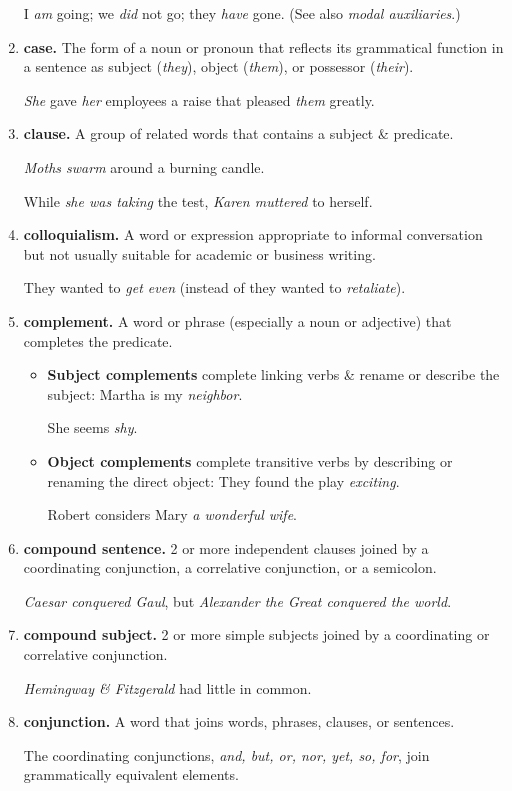 \documentclass{article}
\begin{document}
\begin{enumerate}
	I {\it am} going; we {\it did} not go; they {\it have} gone. (See also {\it modal auxiliaries}.)
	\item {\bf case.} The form of a noun or pronoun that reflects its grammatical function in a sentence as subject ({\it they}), object ({\it them}), or possessor ({\it their}).
	
	{\it She} gave {\it her} employees a raise that pleased {\it them} greatly.
	\item {\bf clause.} A group of related words that contains a subject \& predicate.
	
	{\it Moths swarm} around a burning candle.
	
	While {\it she was taking} the test, {\it Karen muttered} to herself.
	\item {\bf colloquialism.} A word or expression appropriate to informal conversation but not usually suitable for academic or business writing.
	
	They wanted to {\it get even} (instead of they wanted to {\it retaliate}).
	\item {\bf complement.} A word or phrase (especially a noun or adjective) that completes the predicate.
	\begin{itemize}
		\item {\bf Subject complements} complete linking verbs \& rename or describe the subject: Martha is my {\it neighbor}.
		
		She seems {\it shy}.
		\item {\bf Object complements} complete transitive verbs by describing or renaming the direct object: They found the play {\it exciting}.
		
		Robert considers Mary {\it a wonderful wife}.
	\end{itemize}
	\item {\bf compound sentence.} 2 or more independent clauses joined by a coordinating conjunction, a correlative conjunction, or a semicolon.
	
	{\it Caesar conquered Gaul}, but {\it Alexander the Great conquered the world}.
	\item {\bf compound subject.} 2 or more simple subjects joined by a coordinating or correlative conjunction.
	
	{\it Hemingway \& Fitzgerald} had little in common.
	\item {\bf conjunction.} A word that joins words, phrases, clauses, or sentences.
	
	The coordinating conjunctions, {\it and, but, or, nor, yet, so, for}, join grammatically equivalent elements.
	

\end{enumerate}
\end{document}
